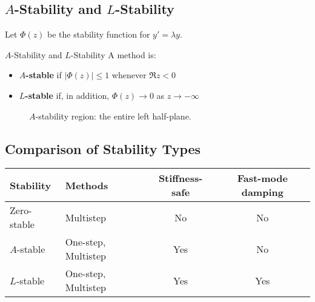 \subsection{\texorpdfstring{$A$}{A}-Stability and \texorpdfstring{$L$}{L}-Stability}
\label{subsec:a-l-stability}

Let $\Phi(z)$ be the stability function for $y'=\lambda y$.

\begin{definition}{$A$-Stability and $L$-Stability}{}
    A method is:
    \begin{itemize}
        \item \textbf{$A$-stable} if $|\Phi(z)|\le1$ whenever $\Re z<0$
        \item \textbf{$L$-stable} if, in addition, $\Phi(z)\to0$ as $z\to-\infty$
    \end{itemize}
\end{definition}

\begin{figure}[ht]
    \centering
    \caption{$A$-stability region: the entire left half-plane.}
    \label{fig:a-stability}
\end{figure}

\subsection{Comparison of Stability Types}
\label{subsec:stability-comparison}

\begin{center}
    \begin{tabular}{@{}l l c c@{}}
        \toprule
        \textbf{Stability} & \textbf{Methods}    & \textbf{Stiffness-safe} & \textbf{Fast-mode damping} \\
        \midrule
        Zero-stable        & Multistep           & No                      & No                         \\
        $A$-stable         & One-step, Multistep & Yes                     & No                         \\
        $L$-stable         & One-step, Multistep & Yes                     & Yes                        \\
        \bottomrule
    \end{tabular}
\end{center}

